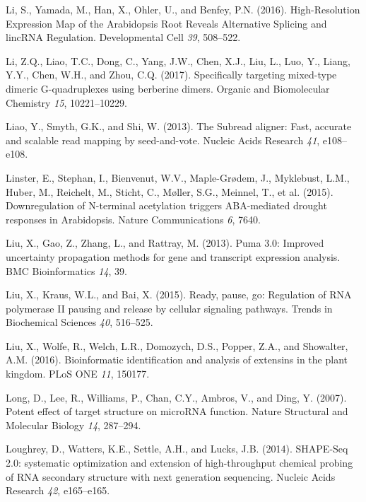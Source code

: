 \documentclass[12pt,a4paper,]{report}
\begin{document}
\leavevmode\hypertarget{ref-Li2016}{}%
Li, S., Yamada, M., Han, X., Ohler, U., and Benfey, P.N. (2016).
High-Resolution Expression Map of the Arabidopsis Root Reveals
Alternative Splicing and lincRNA Regulation. Developmental Cell
\emph{39}, 508--522.

\leavevmode\hypertarget{ref-Li2017}{}%
Li, Z.Q., Liao, T.C., Dong, C., Yang, J.W., Chen, X.J., Liu, L., Luo,
Y., Liang, Y.Y., Chen, W.H., and Zhou, C.Q. (2017). Specifically
targeting mixed-type dimeric G-quadruplexes using berberine dimers.
Organic and Biomolecular Chemistry \emph{15}, 10221--10229.

\leavevmode\hypertarget{ref-Liao2013}{}%
Liao, Y., Smyth, G.K., and Shi, W. (2013). The Subread aligner: Fast,
accurate and scalable read mapping by seed-and-vote. Nucleic Acids
Research \emph{41}, e108--e108.

\leavevmode\hypertarget{ref-Linster2015}{}%
Linster, E., Stephan, I., Bienvenut, W.V., Maple-Grødem, J., Myklebust,
L.M., Huber, M., Reichelt, M., Sticht, C., Møller, S.G., Meinnel, T., et
al. (2015). Downregulation of N-terminal acetylation triggers
ABA-mediated drought responses in Arabidopsis. Nature Communications
\emph{6}, 7640.

\leavevmode\hypertarget{ref-Liu2013}{}%
Liu, X., Gao, Z., Zhang, L., and Rattray, M. (2013). Puma 3.0: Improved
uncertainty propagation methods for gene and transcript expression
analysis. BMC Bioinformatics \emph{14}, 39.

\leavevmode\hypertarget{ref-Liu2015}{}%
Liu, X., Kraus, W.L., and Bai, X. (2015). Ready, pause, go: Regulation
of RNA polymerase II pausing and release by cellular signaling pathways.
Trends in Biochemical Sciences \emph{40}, 516--525.

\leavevmode\hypertarget{ref-Liu2016}{}%
Liu, X., Wolfe, R., Welch, L.R., Domozych, D.S., Popper, Z.A., and
Showalter, A.M. (2016). Bioinformatic identification and analysis of
extensins in the plant kingdom. PLoS ONE \emph{11}, 150177.

\leavevmode\hypertarget{ref-Long2007}{}%
Long, D., Lee, R., Williams, P., Chan, C.Y., Ambros, V., and Ding, Y.
(2007). Potent effect of target structure on microRNA function. Nature
Structural and Molecular Biology \emph{14}, 287--294.

\leavevmode\hypertarget{ref-Loughrey2014}{}%
Loughrey, D., Watters, K.E., Settle, A.H., and Lucks, J.B. (2014).
SHAPE-Seq 2.0: systematic optimization and extension of high-throughput
chemical probing of RNA secondary structure with next generation
sequencing. Nucleic Acids Research \emph{42}, e165--e165.
\end{document}
